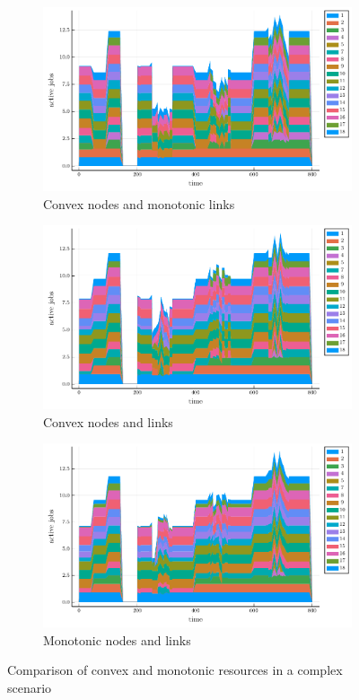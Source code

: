 \begin{figure}[tb]
  \centering
  \begin{subfigure}{\columnwidth}
      \includegraphics[width=\textwidth]{complex-convex-monotonic.pdf}
      \caption{Convex nodes and monotonic links}
      \label{fig:first}
  \end{subfigure}

  \begin{subfigure}{\columnwidth}
      \includegraphics[width=\textwidth]{complex-full-convex.pdf}
      \caption{Convex nodes and links}
      \label{fig:second}
  \end{subfigure}

  \begin{subfigure}{\columnwidth}
      \includegraphics[width=\textwidth]{complex-full-monotonic.pdf}
      \caption{Monotonic nodes and links}
      \label{fig:third}
  \end{subfigure}

  \caption{Comparison of convex and monotonic resources in a complex scenario}

  \label{fig:figures}
  \end{figure}